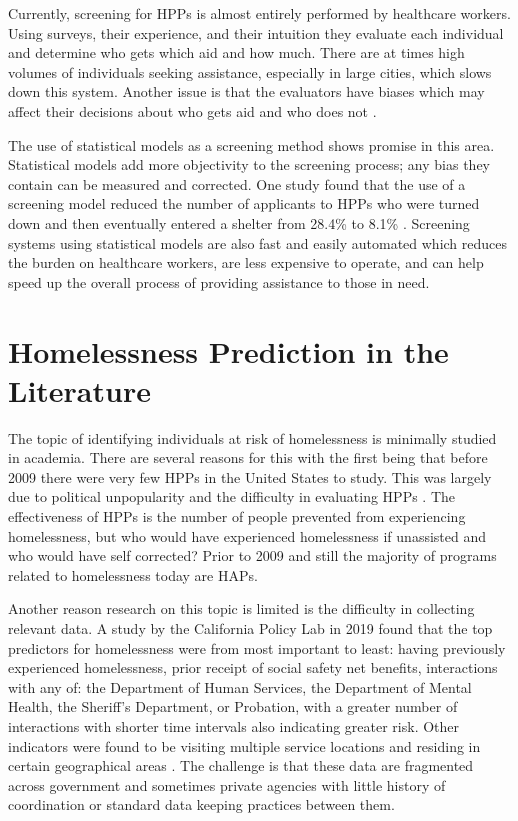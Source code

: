 \documentclass[12pt]{report}
\begin{document}
Currently, screening for HPPs is almost entirely performed by healthcare workers. Using surveys, their experience, and their intuition they evaluate each individual and determine who gets which aid and how much. There are at times high volumes of individuals seeking assistance, especially in large cities, which slows down this system. Another issue is that the evaluators have biases which may affect their decisions about who gets aid and who does not \cite{shinn2019homelessness}.

The use of statistical models as a screening method shows promise in this area. Statistical models add more objectivity to the screening process; any bias they contain can be measured and corrected. One study found that the use of a screening model reduced the number of applicants to HPPs who were turned down and then eventually entered a shelter from 28.4\% to 8.1\% \cite{shinn2019homelessness}. Screening systems using statistical models are also fast and easily automated which reduces the burden on healthcare workers, are less expensive to operate, and can help speed up the overall process of providing assistance to those in need.

\section{Homelessness Prediction in the Literature}
The topic of identifying individuals at risk of homelessness is minimally studied in academia. There are several reasons for this with the first being that before 2009 there were very few HPPs in the United States to study. This was largely due to political unpopularity and the difficulty in evaluating HPPs \cite{colburn2014federal}. The effectiveness of HPPs is the number of people prevented from experiencing homelessness, but who would have experienced homelessness if unassisted and who would have self corrected? Prior to 2009 and still the majority of programs related to homelessness today are HAPs. 

Another reason research on this topic is limited is the difficulty in collecting relevant data. A study by the California Policy Lab in 2019 found that the top predictors for homelessness were from most important to least: having previously experienced homelessness, prior receipt of social safety net benefits, interactions with any of: the Department of Human Services, the Department of Mental Health, the Sheriff's Department, or Probation, with a greater number of interactions with shorter time intervals also indicating greater risk. Other indicators were found to be visiting multiple service locations and residing in certain geographical areas \cite{PredictPreventHmlsnsLA}. The challenge is that these data are fragmented across government and sometimes private agencies with little history of coordination or standard data keeping practices between them.
\end{document}
